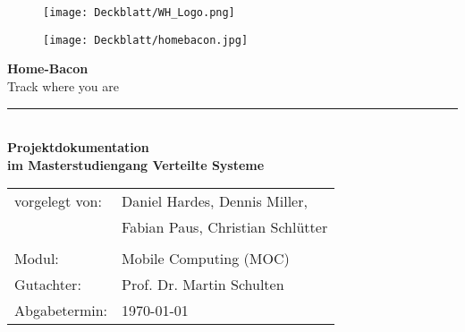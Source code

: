 \thispagestyle{plain}
\begin{titlepage}

\begin{center}
\centering
\begin{figure}
\begin{minipage}{0.65\textwidth}
\texttt{[image: Deckblatt/WH\_Logo.png]}
\end{minipage}
\qquad
\begin{minipage}{0.25\textwidth}
\texttt{[image: Deckblatt/homebacon.jpg]}
\end{minipage}
\end{figure}

\vspace*{2cm}

\Huge{\textbf{Home-Bacon}}\\
\Large{Track where you are}\\
\rule{\textwidth}{0.4pt}\\[3.0ex]

\Large{\textbf{Projektdokumentation}}\\[1.5ex]
\large{\textbf{im Masterstudiengang Verteilte Systeme}}\\[3.0ex]

\normalsize
\begin{tabular}{ll}\\
	vorgelegt von: 
	& \quad Daniel Hardes,  Dennis Miller, \\[1.2ex]
	& \quad Fabian Paus, Christian Schlütter\\[1.2ex]
	& \quad \\[1.2ex]
	Modul:  & \quad Mobile Computing (MOC) \\[1.2ex]
	Gutachter:  & \quad Prof. Dr. Martin Schulten \\[1.2ex]
	Abgabetermin:  & \quad \today\\[1.2ex]
\end{tabular}

\end{center}

\end{titlepage}
